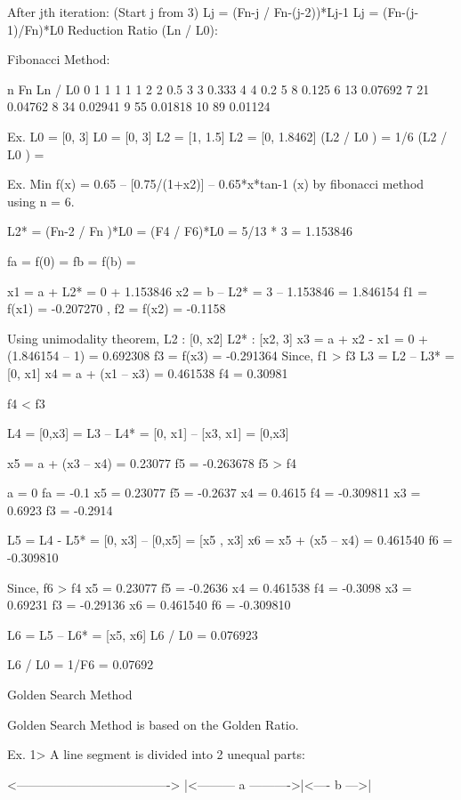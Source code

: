 After jth iteration:
(Start j from 3)
Lj = (Fn-j / Fn-(j-2))*Lj-1
Lj = (Fn-(j-1)/Fn)*L0
Reduction Ratio (Ln / L0):




Fibonacci Method:

n         Fn           Ln / L0
0 		1			1
1		1			1
2		2			0.5
3		3   			0.333
4		4			0.2
5		8			0.125
6		13			0.07692
7		21			0.04762
8		34			0.02941
9		55			0.01818
10		89			0.01124

Ex. L0 = [0, 3]                             L0  = [0, 3]		
	L2  = [1, 1.5]					 L2 = [0, 1.8462]
	(L2 / L0 ) = 1/6				(L2 / L0 ) = 


Ex. Min f(x) = 0.65 – [0.75/(1+x2)] – 0.65*x*tan-1 (x) by fibonacci method using n = 6.

L2* = (Fn-2 / Fn )*L0 = (F4 / F6)*L0 = 5/13 * 3 = 1.153846

fa = f(0) =          fb = f(b) = 

x1 = a + L2*  = 0 + 1.153846
x2 = b – L2* = 3 – 1.153846 = 1.846154
f1 = f(x1) = -0.207270 , f2 = f(x2) = -0.1158

Using unimodality theorem,
L2 : [0, x2]
L2* : [x2, 3]
x3 = a + x2  - x1 = 0 + (1.846154 – 1) = 0.692308
f3 = f(x3) = -0.291364
Since, f1 > f3 
L3 = L2 – L3* = [0, x1] 
x4 = a + (x1 – x3) = 0.461538
f4 = 0.30981

f4 < f3 

L4 = [0,x3] = L3 – L4* = [0, x1] – [x3, x1]
			= [0,x3]

x5  = a + (x3 – x4) = 0.23077
f5 = -0.263678
f5 > f4

a = 0			fa = -0.1
x5 = 0.23077			f5 = -0.2637
x4 = 0.4615			f4  = -0.309811
x3 = 0.6923			f3  = -0.2914

L5 = L4 - L5*  = [0, x3] – [0,x5] = [x5 , x3]
x6   = x5 + (x5 – x4) = 0.461540
f6 = -0.309810

Since, f6 > f4
x5  = 0.23077 		f5 = -0.2636    
x4 = 0.461538		f4 = -0.3098
x3 = 0.69231		f3  = -0.29136
x6 = 0.461540 		f6 = -0.309810

L6  = L5 – L6* = [x5, x6]
L6 / L0  = 0.076923

L6 / L0 = 1/F6 = 0.07692


			Golden Search Method



Golden Search Method is based on the Golden Ratio.

Ex. 1>  A line segment is divided into 2 unequal parts:

<------------------------------------->
|<--------- a ---------->|<---- b --->|

